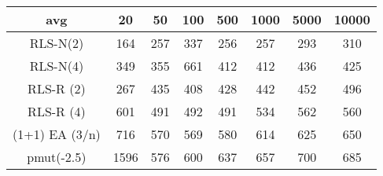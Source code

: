 \begin{tabular}[h]{cccccccc}
avg&20&50&100&500&1000&5000&10000\\\hline
RLS-N(2)&164&257&337&256&257&293&310\\
RLS-N(4)&349&355&661&412&412&436&425\\
RLS-R (2)&267&435&408&428&442&452&496\\
RLS-R (4)&601&491&492&491&534&562&560\\
(1+1) EA (3/n)&716&570&569&580&614&625&650\\
pmut(-2.5)&1596&576&600&637&657&700&685\\
\end{tabular}
